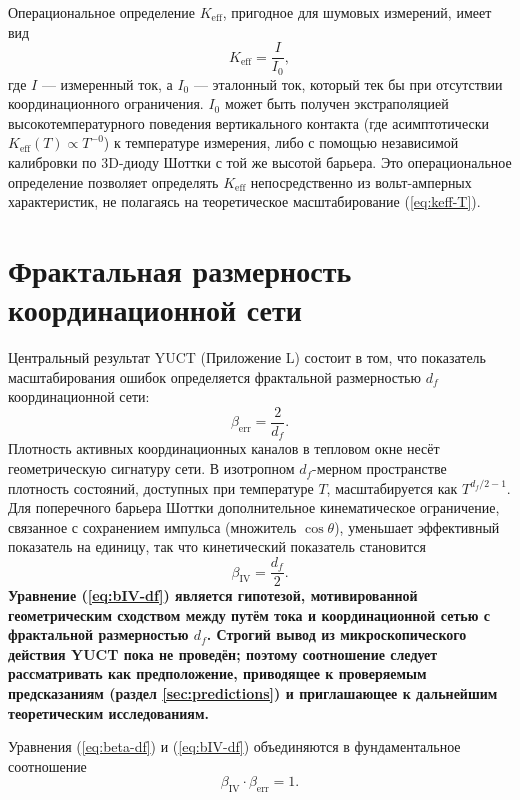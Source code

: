 \documentclass[12pt,a4paper]{article}
\newcommand{\Keff}{K_{\mathrm{eff}}}
\begin{document}
	Операциональное определение $\Keff$, пригодное для шумовых измерений,
	имеет вид
	\begin{equation}
		\Keff = \frac{I}{I_0},
		\label{eq:keff-operational}
	\end{equation}
	где $I$ — измеренный ток, а $I_0$ — эталонный ток, который тек бы при
	отсутствии координационного ограничения. $I_0$ может быть получен
	экстраполяцией высокотемпературного поведения вертикального контакта
	(где асимптотически $\Keff(T) \propto T^{-0}$) к температуре измерения,
	либо с помощью независимой калибровки по 3D-диоду Шоттки с той же высотой
	барьера. Это операциональное определение позволяет определять $\Keff$
	непосредственно из вольт-амперных характеристик, не полагаясь на
	теоретическое масштабирование (\ref{eq:keff-T}).
	
	\section{Фрактальная размерность координационной сети}
	
	Центральный результат YUCT (Приложение L) состоит в том, что показатель
	масштабирования ошибок определяется фрактальной размерностью $d_f$
	координационной сети:
	\begin{equation}
		\beta_{\mathrm{err}} = \frac{2}{d_f}.
		\label{eq:beta-df}
	\end{equation}
	Плотность активных координационных каналов в тепловом окне несёт
	геометрическую сигнатуру сети. В изотропном $d_f$-мерном пространстве
	плотность состояний, доступных при температуре $T$, масштабируется как
	$T^{d_f/2 - 1}$. Для поперечного барьера Шоттки дополнительное кинематическое
	ограничение, связанное с сохранением импульса (множитель $\cos\theta$),
	уменьшает эффективный показатель на единицу, так что кинетический показатель
	становится
	\begin{equation}
		\beta_{\mathrm{IV}} = \frac{d_f}{2}.
		\label{eq:bIV-df}
	\end{equation}
	\textbf{Уравнение (\ref{eq:bIV-df}) является гипотезой, мотивированной
		геометрическим сходством между путём тока и координационной сетью с
		фрактальной размерностью $d_f$. Строгий вывод из микроскопического
		действия YUCT пока не проведён; поэтому соотношение следует рассматривать
		как предположение, приводящее к проверяемым предсказаниям (раздел \ref{sec:predictions})
		и приглашающее к дальнейшим теоретическим исследованиям.}
	
	Уравнения (\ref{eq:beta-df}) и (\ref{eq:bIV-df}) объединяются в фундаментальное
	соотношение
	\begin{equation}
		\boxed{\beta_{\mathrm{IV}} \cdot \beta_{\mathrm{err}} = 1}.
		\label{eq:relation}
	\end{equation}
	
\end{document}
